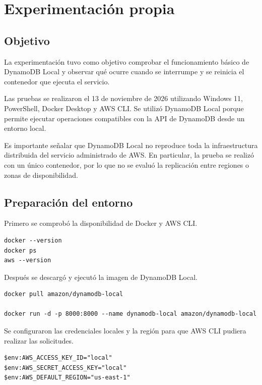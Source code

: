 \documentclass[12pt,a4paper]{article}
\begin{document}
\section{Experimentación propia}

\subsection{Objetivo}

La experimentación tuvo como objetivo comprobar el funcionamiento básico de DynamoDB Local y observar qué ocurre cuando se interrumpe y se reinicia el contenedor que ejecuta el servicio.

Las pruebas se realizaron el 13 de noviembre de 2026 utilizando Windows 11, PowerShell, Docker Desktop y AWS CLI. Se utilizó DynamoDB Local porque permite ejecutar operaciones compatibles con la API de DynamoDB desde un entorno local.

Es importante señalar que DynamoDB Local no reproduce toda la infraestructura distribuida del servicio administrado de AWS. En particular, la prueba se realizó con un único contenedor, por lo que no se evaluó la replicación entre regiones o zonas de disponibilidad.

\subsection{Preparación del entorno}

Primero se comprobó la disponibilidad de Docker y AWS CLI.

\begin{lstlisting}
docker --version
docker ps
aws --version
\end{lstlisting}

Después se descargó y ejecutó la imagen de DynamoDB Local.

\begin{lstlisting}
docker pull amazon/dynamodb-local

docker run -d -p 8000:8000 --name dynamodb-local amazon/dynamodb-local
\end{lstlisting}

Se configuraron las credenciales locales y la región para que AWS CLI pudiera realizar las solicitudes.

\begin{lstlisting}
$env:AWS_ACCESS_KEY_ID="local"
$env:AWS_SECRET_ACCESS_KEY="local"
$env:AWS_DEFAULT_REGION="us-east-1"
\end{lstlisting}
\end{document}
